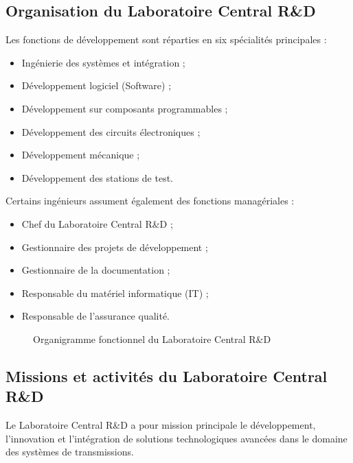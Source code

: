 \subsection{Organisation du Laboratoire Central R\&D}
\label{subsec:org_labo}

Les fonctions de développement sont réparties en six spécialités principales :
\begin{itemize}
    \item Ingénierie des systèmes et intégration ;
    \item Développement logiciel (Software) ;
    \item Développement sur composants programmables ;
    \item Développement des circuits électroniques ;
    \item Développement mécanique ;
    \item Développement des stations de test.
\end{itemize}

Certains ingénieurs assument également des fonctions managériales :
\begin{itemize}
    \item Chef du Laboratoire Central R\&D ;
    \item Gestionnaire des projets de développement ;
    \item Gestionnaire de la documentation ;
    \item Responsable du matériel informatique (IT) ;
    \item Responsable de l'assurance qualité.
\end{itemize}

\begin{figure}[H]
    \centering
    \caption{Organigramme fonctionnel du Laboratoire Central R\&D}
    \label{fig:organigramme_rd}
\end{figure}

\subsection{Missions et activités du Laboratoire Central R\&D}
\label{subsec:missions_labo}

Le Laboratoire Central R\&D a pour mission principale le développement, l'innovation et l'intégration de solutions technologiques avancées dans le domaine des systèmes de transmissions.

